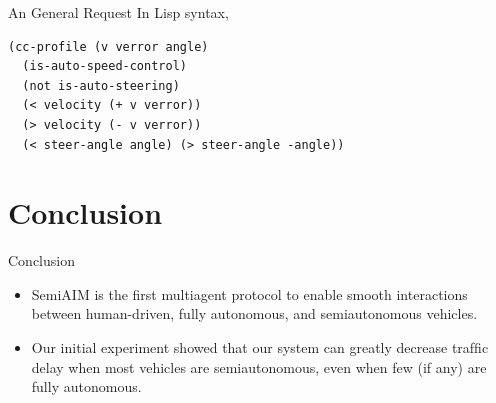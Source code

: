 \documentclass{beamer}
\begin{document}
\begin{frame}[fragile]{An General Request}
In Lisp syntax,

\begin{small}
\begin{verbatim}
(cc-profile (v verror angle)
  (is-auto-speed-control)
  (not is-auto-steering)
  (< velocity (+ v verror))
  (> velocity (- v verror))
  (< steer-angle angle) (> steer-angle -angle))
\end{verbatim}
\end{small}
\end{frame}

\section{Conclusion}

\begin{frame}{Conclusion}
\begin{itemize}
\item SemiAIM is the first multiagent protocol to enable smooth interactions
between human-driven, fully autonomous, and semiautonomous vehicles.
\item Our initial experiment showed that our system can greatly decrease
trafﬁc delay when most vehicles are semiautonomous, even when few
(if any) are fully autonomous.
\end{itemize}
\end{frame}
\end{document}
